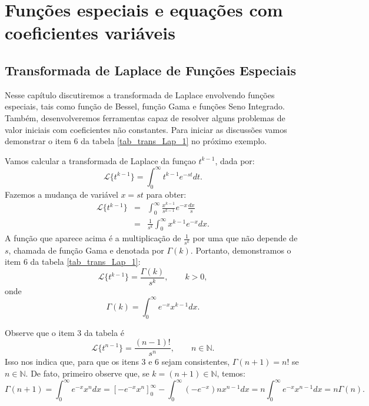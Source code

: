 \chapter{Funções especiais e equações com coeficientes variáveis}
\section{Transformada de Laplace de Funções Especiais}
Nesse capítulo discutiremos a transformada de Laplace envolvendo funções especiais, tais como função de Bessel, função Gama e funções Seno Integrado. Também, desenvolveremos ferramentas capaz de resolver alguns problemas de valor iniciais com coeficientes não constantes.
Para iniciar as discussões vamos demonstrar o item 6 da tabela \ref{tab_trans_Lap_1} no próximo exemplo.
\begin{ex}Vamos calcular a transformada de Laplace da funçao $t^{k-1}$, dada por:
\begin{equation}
\mathcal{L}\{t^{k-1} \}=\int_0^\infty t^{k-1} e^{-st}dt.
\end{equation}
Fazemos a mudança de variável $x=st$ para obter:
\begin{eqnarray*}
 \mathcal{L}\{t^{k-1} \}&=&\int_0^\infty \frac{x^{k-1}}{s^{k-1}}e^{-x}\frac{dx}{s}\\
 &=&\frac{1}{s^k}\int_0^\infty x^{k-1}e^{-x} dx.
 \end{eqnarray*}
A função que aparece acima é a multiplicação de $\frac{1}{s^k}$ por uma que não depende de $s$, chamada de função Gama e denotada por $\Gamma(k)$. Portanto, demonstramos o item 6 da tabela \ref{tab_trans_Lap_1}:
\begin{equation}
\mathcal{L}\{t^{k-1} \}=\frac{\Gamma(k)}{s^k},\qquad k>0,
\end{equation}
onde
\begin{equation}
\Gamma(k)=\int_0^\infty e^{-x}x^{k-1}dx.
\end{equation}
\end{ex}
Observe que o item 3 da tabela é
\begin{equation}
\mathcal{L}\{t^{n-1}\}=\frac{(n-1)!}{s^n}, \qquad n\in \mathbb{N}.
\end{equation}
Isso nos indica que, para que os itens 3 e 6 sejam consistentes, $\Gamma(n+1)=n!$ se $n\in\mathbb{N}$. De fato, primeiro observe que, se $k=(n+1)\in\mathbb{N}$, temos:
\begin{equation}
\Gamma(n+1)=\int_0^\infty e^{-x}x^{n}dx=\left[-e^{-x}x^{n}\right]_0^\infty-\int_0^\infty (-e^{-x})nx^{n-1}dx=n\int_0^\infty e^{-x}x^{n-1}dx=n\Gamma(n).
\end{equation}
